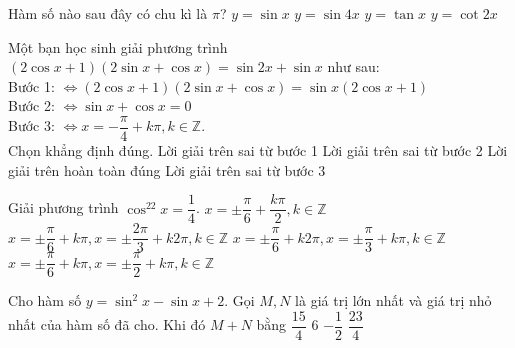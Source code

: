 \begin{ex}%
Hàm số nào sau đây có chu kì là $\pi$?
\choice
{$y=\sin x$}
{$y=\sin 4x$}
{\True $y=\tan x$}
{$y=\cot 2x$}
\end{ex}

\begin{ex}%
Một bạn học sinh giải phương trình $(2\cos x+1)(2\sin x+\cos x)=\sin 2x+\sin x$ như sau: \\
Bước 1:  $\Leftrightarrow (2\cos x+1)(2\sin x+\cos x)=\sin x(2\cos x+1)$ \\
Bước 2:  $\Leftrightarrow \sin x+ \cos x=0$ \\
Bước 3:  $\Leftrightarrow x=-\dfrac{\pi}{4}+k\pi, k \in \mathbb{Z}$. \\
Chọn khẳng định đúng.
\choice
{Lời giải trên sai từ bước 1}
{\True Lời giải trên sai từ bước 2}
{Lời giải trên hoàn toàn đúng}
{Lời giải trên sai từ bước 3}
\end{ex}

\begin{ex}%
Giải phương trình $\cos^22x = \dfrac{1}{4}$.
\choice
{\True $x=\pm \dfrac{\pi}{6}+\dfrac{k\pi}{2}, k \in \mathbb{Z}$}
{$x=\pm \dfrac{\pi}{6}+k\pi, x=\pm \dfrac{2\pi}{3}+k2\pi,k \in \mathbb{Z}$}
{$x=\pm \dfrac{\pi}{6}+k2\pi, x=\pm \dfrac{\pi}{3}+k\pi,k \in \mathbb{Z}$}
{$x=\pm \dfrac{\pi}{6}+k\pi, x=\pm \dfrac{\pi}{2}+k\pi,k \in \mathbb{Z}$}
\end{ex}

\begin{ex}%
Cho hàm số $y=\sin^2x -\sin x+2$. Gọi $M,N$ là giá trị  lớn nhất và giá trị nhỏ nhất của hàm số đã cho. Khi đó $M+N$ bằng
\choice
{$\dfrac{15}{4}$}
{$6$}
{$-\dfrac{1}{2}$}
{\True $\dfrac{23}{4}$}
\end{ex}

